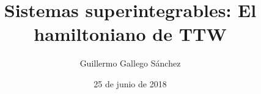 \documentclass[aspectratio=169,mathserif]{beamer}
\title{Sistemas superintegrables: El hamiltoniano de TTW}
\author{Guillermo Gallego Sánchez}
\institute{Departamento de Física Teórica}
\date{25 de junio de 2018}
\newcommand{\vect}[1]{\mathbf{#1}}
\begin{document}
\begin{frame}
  \maketitle
\end{frame}



\end{document}
